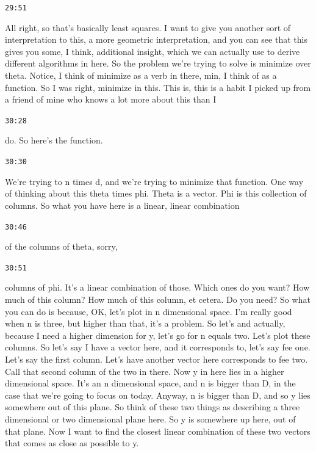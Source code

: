 \documentclass[11pt,a4paper]{article}
\newcommand{\timestamp}[1]{%
  \par\vspace{0.35em}%
  \noindent\colorbox{timestampback}{\textcolor{timestampblue}{\small\texttt{#1}}}%
  \par\vspace{0.2em}%
}
\begin{document}
\timestamp{29:51}

All right, so that's basically least squares. I want to give you another sort of interpretation to this, a more geometric interpretation, and you can see that this gives you some, I think, additional insight, which we can actually use to derive different algorithms in here. So the problem we're trying to solve is minimize over theta. Notice, I think of minimize as a verb in there, min, I think of as a function. So I was right, minimize in this. This is, this is a habit I picked up from a friend of mine who knows a lot more about this than I



\timestamp{30:28}

do. So here's the function.



\timestamp{30:30}

We're trying to n times d, and we're trying to minimize that function. One way of thinking about this theta times phi. Theta is a vector. Phi is this collection of columns. So what you have here is a linear, linear combination



\timestamp{30:46}

of the columns of theta, sorry,



\timestamp{30:51}

columns of phi. It's a linear combination of those. Which ones do you want? How much of this column? How much of this column, et cetera. Do you need? So what you can do is because, OK, let's plot in n dimensional space. I'm really good when n is three, but higher than that, it's a problem. So let's and actually, because I need a higher dimension for y, let's go for n equals two. Let's plot these columns. So let's say I have a vector here, and it corresponds to, let's say fee one. Let's say the first column. Let's have another vector here corresponds to fee two. Call that second column of the two in there. Now y in here lies in a higher dimensional space. It's an n dimensional space, and n is bigger than D, in the case that we're going to focus on today. Anyway, n is bigger than D, and so y lies somewhere out of this plane. So think of these two things as describing a three dimensional or two dimensional plane here. So y is somewhere up here, out of that plane. Now I want to find the closest linear combination of these two vectors that comes as close as possible to y.
\end{document}
